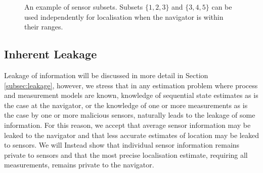 \documentclass[twocolumn]{autart}
\begin{document}
\begin{figure}[htbp]
\caption{An example of sensor subsets. Subsets $\{1,2,3\}$ and $\{3,4,5\}$ can be used independently for localisation when the navigator is within their ranges.}
\label{fig:sensor_subsets}
\end{figure}

% 
% 

\subsection{Inherent Leakage}
Leakage of information will be discussed in more detail in Section \ref{subsec:leakage}, however, we stress that in any estimation problem where process and measurement models are known, knowledge of sequential state estimates as is the case at the navigator, or the knowledge of one or more measurements as is the case by one or more malicious sensors, naturally leads to the leakage of some information. For this reason, we accept that average sensor information may be leaked to the navigator and that less accurate estimates of location may be leaked to sensors. We will Instead show that individual sensor information remains private to sensors and that the most precise localisation estimate, requiring all measurements, remains private to the navigator. 
\end{document}
